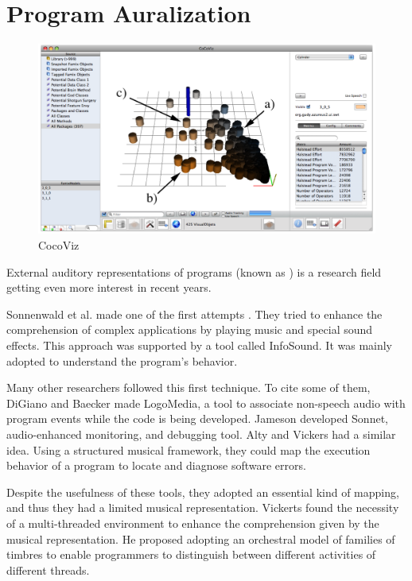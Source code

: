 \section{Program Auralization}
\begin{figure}[ht]
\centering
  \includegraphics[width=0.9\linewidth]{CocoViz.png} 
  \caption{CocoViz}
  \label{fig:cocoviz}
\end{figure}


External auditory representations of programs (known as ) is a research field getting even more interest in recent years.

Sonnenwald et al. made one of the first attempts \cite{Sonnenwald1990}.
They tried to enhance the comprehension of complex applications by playing music and special sound effects. 
This approach was supported by a tool called InfoSound.
It was mainly adopted to understand the program's behavior. 

Many other researchers followed this first technique. To cite some of them, DiGiano and Baecker \cite{DiGiano1993} made LogoMedia, a tool to associate non-speech
 audio with program events while the code is being developed. 
Jameson \cite{Jameson1994} developed Sonnet, audio-enhanced monitoring, and debugging tool.  
Alty and Vickers \cite{Vickers2003} had a similar idea. Using a structured musical framework, they could map the execution behavior of a program to locate and diagnose software errors. 
 
Despite the usefulness of these tools, they adopted an essential kind of mapping, and thus they had a limited musical representation. 
Vickerts \cite{Vickers2004} found the necessity of a multi-threaded environment to enhance the comprehension given by the musical representation. 
He proposed adopting an orchestral model of families of timbres to enable programmers to distinguish between different activities of different threads.

